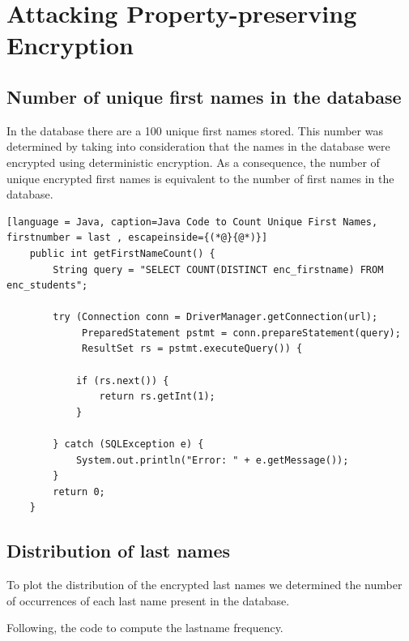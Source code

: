 \section{Attacking Property-preserving Encryption}

\subsection{Number of unique first names in the database}

In the database there are a 100 unique first names stored. This number was determined by taking into consideration that the names in the database were encrypted using deterministic encryption. As a consequence, the number of unique encrypted first names is equivalent to the number of first names in the database.

\begin{lstlisting}[language = Java, caption=Java Code to Count Unique First Names, firstnumber = last , escapeinside={(*@}{@*)}]
    public int getFirstNameCount() {
        String query = "SELECT COUNT(DISTINCT enc_firstname) FROM enc_students";
    
        try (Connection conn = DriverManager.getConnection(url);
             PreparedStatement pstmt = conn.prepareStatement(query);
             ResultSet rs = pstmt.executeQuery()) {
    
            if (rs.next()) {
                return rs.getInt(1);
            }
    
        } catch (SQLException e) {
            System.out.println("Error: " + e.getMessage());
        }
        return 0;
    }
\end{lstlisting}

\subsection{Distribution of last names}

To plot the distribution of the encrypted last names we determined the number of occurrences of each last name present in the database.

Following, the code to compute the lastname frequency.


